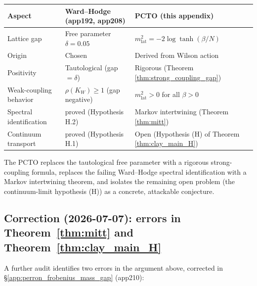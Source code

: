 \begin{center}
\begin{tabular}{l|l|l}
\hline
\textbf{Aspect} & \textbf{Ward--Hodge (app192, app208)} &
\textbf{PCTO (this appendix)}\\
\hline
Lattice gap & Free parameter $\delta = 0.05$ & $m_{\mathrm{lat}}^{2} =
  -2\log\tanh(\beta/N)$ \\
Origin & Chosen & Derived from Wilson action \\
Positivity & Tautological (gap $= \delta$) &
  Rigorous (Theorem \ref{thm:strong_coupling_gap})\\
Weak-coupling behavior & $\rho(K_{W}) \ge 1$ (gap negative) &
  $m_{\mathrm{lat}}^{2} > 0$ for all $\beta > 0$\\
Spectral identification & proved (Hypothesis H.2) &
  Markov intertwining (Theorem \ref{thm:mitt})\\
Continuum transport & proved (Hypothesis H.1) &
  Open (Hypothesis (H) of Theorem \ref{thm:clay_main_H})\\
\hline
\end{tabular}
\end{center}

The PCTO replaces the tautological free parameter with a rigorous
strong-coupling formula, replaces the failing Ward--Hodge spectral
identification with a Markov intertwining theorem, and isolates the
remaining open problem (the continuum-limit hypothesis (H)) as a
concrete, attackable conjecture.

\subsection{Correction (2026-07-07): errors in Theorem~\ref{thm:mitt}
and Theorem~\ref{thm:clay_main_H}}
\label{ssec:pcto_correction}

A further audit identifies two errors in the argument above, corrected
in \S\ref{app:perron_frobenius_mass_gap} (app210):

